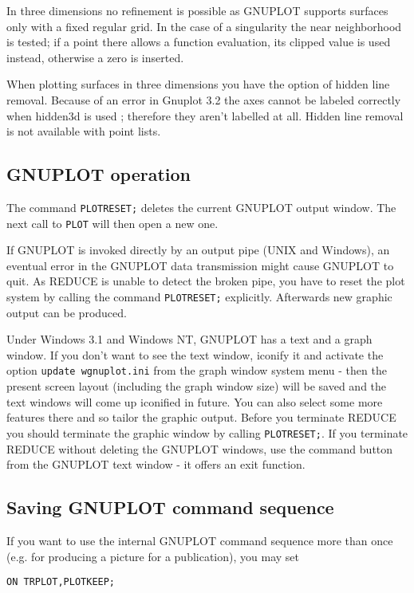 In three dimensions no refinement is possible as 
GNUPLOT supports surfaces
only with a fixed regular grid. In the case
of a singularity the near neighborhood is
tested; if a point there allows a function evaluation, its 
clipped value is used instead, otherwise a zero is inserted.

When plotting surfaces in three dimensions you have the
option of hidden line removal. Because of an error in
Gnuplot 3.2 the axes cannot be labeled
correctly when hidden3d is used ; therefore they aren't labelled at all. Hidden line
removal is not available with point lists.


\subsection{GNUPLOT operation}

The command \verb+PLOTRESET;+ deletes the current GNUPLOT output
window. The next call to \verb+PLOT+ will then open a new one.

If GNUPLOT is invoked directly by an output pipe (UNIX and Windows),
an eventual error in the GNUPLOT data transmission might cause GNUPLOT to
quit. As {\small REDUCE} is unable to detect the broken pipe, you
have to reset the plot system by calling the 
command \verb+PLOTRESET;+ explicitly. Afterwards new graphic output
can be produced. 

Under Windows 3.1 and Windows NT, GNUPLOT has a text and a graph window.
If you don't want to see the text window, iconify it and
activate the option \verb+update wgnuplot.ini+ from the
graph window system menu - then the present screen layout
(including the graph window size) will be saved and the text
windows will come up iconified in future. You can also select 
some more features there and so tailor the graphic output.
Before you terminate {\small REDUCE} you should terminate the
graphic window by calling \verb+PLOTRESET;+.
If you terminate {\small REDUCE} without deleting the
GNUPLOT windows, use the command button from the
GNUPLOT text window - it offers an exit function.

\subsection{Saving GNUPLOT command sequence}

If you want to use the internal GNUPLOT command sequence
more than once (e.g. for producing a picture for a publication),
you may set 

\begin{verbatim}
ON TRPLOT,PLOTKEEP;
\end{verbatim}

